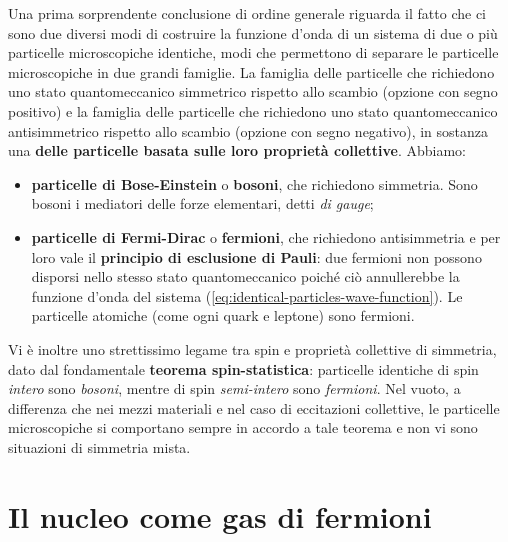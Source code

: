Una prima sorprendente conclusione di ordine generale riguarda il fatto che ci sono due diversi modi di costruire la
funzione d’onda di un sistema di due o più particelle microscopiche identiche, modi che permettono di separare
le particelle microscopiche in due grandi famiglie.
La famiglia delle particelle che richiedono uno stato quantomeccanico simmetrico rispetto allo scambio
(opzione con segno positivo) e la famiglia delle particelle che richiedono uno stato quantomeccanico antisimmetrico
rispetto allo scambio (opzione con segno negativo), in sostanza una \textbf{ delle particelle basata sulle loro proprietà
collettive}.
Abbiamo:
\begin{itemize}
	\item \textbf{particelle di Bose-Einstein} o \textbf{bosoni}, che richiedono simmetria.
	Sono bosoni i mediatori delle forze elementari, detti \textit{di gauge};
	\item \textbf{particelle di Fermi-Dirac} o \textbf{fermioni}, che richiedono antisimmetria e per loro vale il
	\textbf{principio di esclusione di Pauli}:
	due fermioni non possono disporsi nello stesso stato quantomeccanico poiché ciò annullerebbe la funzione d'onda del sistema
	(\ref{eq:identical-particles-wave-function}).
	Le particelle atomiche (come ogni quark e leptone) sono fermioni.
\end{itemize}
Vi è inoltre uno strettissimo legame tra spin e proprietà collettive di simmetria, dato dal fondamentale \textbf{teorema spin-statistica}:
particelle identiche di spin \textit{intero} sono \textit{bosoni}, mentre di spin \textit{semi-intero} sono \textit{fermioni}.
Nel vuoto, a differenza che nei mezzi materiali e nel caso di eccitazioni collettive, le particelle microscopiche si
comportano sempre in accordo a tale teorema e non vi sono situazioni di simmetria mista.


\section{Il nucleo come gas di fermioni}\label{sec:il-nucleo-come-gas-di-fermioni}

